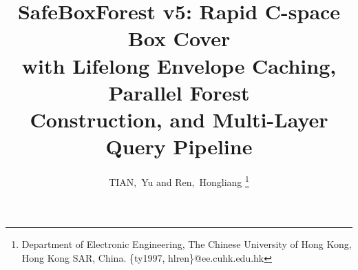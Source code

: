 \documentclass[journal]{IEEEtran}
\begin{document}
\title{SafeBoxForest v5: Rapid C-space Box Cover\\
with Lifelong Envelope Caching, Parallel Forest\\
Construction, and Multi-Layer Query Pipeline}

\author{
  TIAN,~Yu and Ren,~Hongliang
  \thanks{Department of Electronic Engineering,
  The Chinese University of Hong Kong, Hong Kong SAR, China.
  \{ty1997, hlren\}@ee.cuhk.edu.hk}
}


\maketitle

\end{document}
